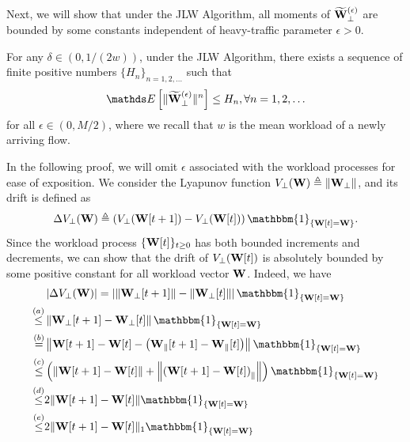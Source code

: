 \documentclass[10pt, conference, letterpaper]{IEEEtran} %
\begin{document}
Next, we will show that under the JLW Algorithm, all moments of $\widetilde{\mathbf{W}}_{\perp}^{(\epsilon)}$ are bounded by some constants independent of heavy-traffic parameter $\epsilon>0$.
\begin{proposition} 
\label{prop:SSC}
For any $\delta\in(0,1/(2w))$, under the JLW Algorithm, there exists a sequence of finite positive numbers $\{H_n\}_{n=1,2,\ldots}$ such that 
\begin{align}
\bE\left[\|\wt{\mb{W}}_{\perp}^{(\epsilon)}\|^{n}\right]\leq H_n, \forall n=1,2,\ldots
\end{align}
for all $\epsilon\in(0,M/2)$, where we recall that $w$ is the mean workload of a newly arriving flow.
\end{proposition}
\begin{IEEEproof}
In the following proof, we will omit $\epsilon$ associated with the workload processes for ease of exposition. We consider the Lyapunov function 
$V_{\perp}(\mathbf{W})\triangleq\|\mathbf{W}_{\perp}\|$, and its drift is defined as 
\begin{align}
\Delta V_{\perp}(\mb{W})\triangleq \left(V_{\perp}(\mb{W}[t+1])-V_{\perp}(\mb{W}[t])\right)\mathbbm{1}_{\{\mb{W}[t]=\mb{W}\}}.
\end{align}
Since the workload process $\{\mathbf{W}[t]\}_{t\geq0}$ has both bounded increments and decrements, we can show that the drift of $V_{\perp}(\mathbf{W}[t])$ is absolutely bounded by some positive constant for all workload vector $\mathbf{W}$. Indeed, we have 
\begin{align*}
&\left|\Delta V_{\perp}(\mb{W})\right|=\left|\left\|\mb{W}_{\perp}[t+1]\|-\|\mb{W}_{\perp}[t]\right\|\right|\mathbbm{1}_{\{\mb{W}[t]=\mb{W}\}} \nonumber\\
\stackrel{(a)}{\leq}&\left\|\mb{W}_{\perp}[t+1]-\mb{W}_{\perp}[t]\right\|\mathbbm{1}_{\{\mb{W}[t]=\mb{W}\}}   \nonumber\\
\stackrel{(b)}{=}&\left\|\mb{W}[t+1]-\mb{W}[t]-\left(\mb{W}_{\parallel}[t+1]-\mb{W}_{\parallel}[t]\right)\right\|\mathbbm{1}_{\{\mb{W}[t]=\mb{W}\}} \nonumber\\
\stackrel{(c)}{\leq}&\left(\left\|\mb{W}[t+1]-\mb{W}[t]\right\|+\left\|\left(\mb{W}[t+1]-\mb{W}[t]\right)_{\parallel}\right\|\right)\mathbbm{1}_{\{\mb{W}[t]=\mb{W}\}} \nonumber\\
\stackrel{(d)}{\leq}&2\|\mb{W}[t+1]-\mb{W}[t]\|\mathbbm{1}_{\{\mb{W}[t]=\mb{W}\}}\nonumber\\
\stackrel{(e)}{\leq}&2\|\mb{W}[t+1]-\mb{W}[t]\|_{1}\mathbbm{1}_{\{\mb{W}[t]=\mb{W}\}} \nonumber\\

\end{align*}
\end{IEEEproof}
\end{document}
